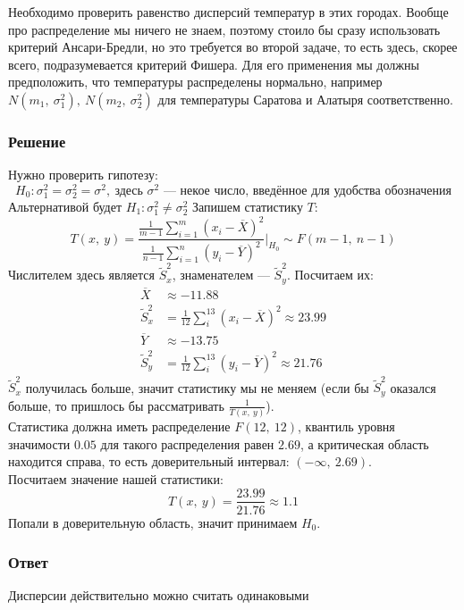 \documentclass[12pt, a4paper]{article}
\begin{document}
Необходимо проверить равенство дисперсий температур в этих городах. Вообще про распределение мы ничего не знаем, поэтому стоило бы сразу использовать критерий Ансари-Бредли, но это требуется во второй задаче, то есть здесь, скорее всего, подразумевается критерий Фишера. Для его применения мы должны предположить, что температуры распределены нормально, например $N(m_1,\ \sigma_1^2),\ N(m_2,\ \sigma_2^2)$ для температуры Саратова и Алатыря соответственно.\\
\subsubsection*{Решение}
Нужно проверить гипотезу:
\[H_0: \sigma_1^2 = \sigma_2^2 = \sigma^2,\ \text{здесь $\sigma^2$ --- некое число, введённое для удобства обозначения}\]
Альтернативой будет $H_1: \sigma_1^2 \neq \sigma_2^2$
Запишем статистику $T$:
\[T(x,\ y) = \frac{\frac{1}{m - 1} \sum_{i = 1}^{m} {\left( x_i - \overline{X} \right)}^2}{\frac{1}{n - 1} \sum_{i = 1}^n {\left( y_i - \overline{Y} \right)}^2} \Bigg|_{H_0} \sim F(m - 1,\ n - 1)\]
Числителем здесь является $\tilde S_x^2$, знаменателем --- $\tilde S_y^2$. Посчитаем их:
\begin{equation*}
    \begin{aligned}
        \overline{X} &\approx -11.88 \\
        \tilde S_x^2 &= \frac{1}{12} \sum_{i}^{13} {\left(x_i - \overline{X}\right)}^2 \approx 23.99\\
        \overline{Y} &\approx -13.75\\
        \tilde S_y^2 &= \frac{1}{12} \sum_{i}^{13} {\left(y_i - \overline{Y}\right)}^2 \approx 21.76
    \end{aligned}
\end{equation*}
$\tilde S_x^2$ получилась больше, значит статистику мы не меняем (если бы $\tilde S_y^2$ оказался больше, то пришлось бы рассматривать $\frac{1}{T(x,\ y)}$).\\
Статистика должна иметь распределение $F(12,\ 12)$, квантиль уровня значимости $0.05$ для такого распределения равен $2.69$, а критическая область находится справа, то есть доверительный интервал: $(-\infty,\ 2.69)$.\\
Посчитаем значение нашей статистики:
\[T(x,\ y) = \frac{23.99}{21.76} \approx 1.1\]
Попали в доверительную область, значит принимаем $H_0$.
\subsubsection*{Ответ}
Дисперсии действительно можно считать одинаковыми
\end{document}
